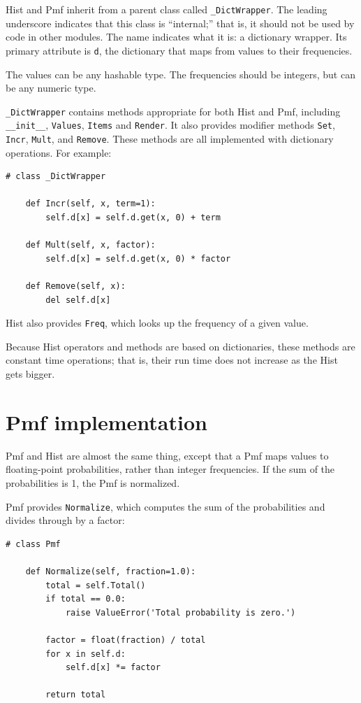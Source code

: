 \documentclass[12pt]{book}
\theoremstyle{exercise}
\begin{document}
Hist and Pmf inherit from a parent class called \verb"_DictWrapper".
The leading underscore indicates that this class is ``internal;'' that
is, it should not be used by code in other modules.  The name
indicates what it is: a dictionary wrapper.  Its primary attribute is
{\tt d}, the dictionary that maps from values to their frequencies.%
%
%

The values can be any hashable type.  The frequencies should be integers,
but can be any numeric type.%

\verb"_DictWrapper" contains methods appropriate for both
Hist and Pmf, including \verb"__init__", {\tt Values},
{\tt Items} and {\tt Render}.  It also provides modifier
methods {\tt Set}, {\tt Incr}, {\tt Mult}, and {\tt Remove}.  These
methods are all implemented with dictionary operations.  For example:%

\begin{verbatim}
# class _DictWrapper

    def Incr(self, x, term=1):
        self.d[x] = self.d.get(x, 0) + term

    def Mult(self, x, factor):
        self.d[x] = self.d.get(x, 0) * factor

    def Remove(self, x):
        del self.d[x]
\end{verbatim}

Hist also provides {\tt Freq}, which looks up the frequency
of a given value.%

Because Hist operators and methods are based on dictionaries,
these methods are constant time operations;
that is, their run time does not increase as the Hist gets bigger.%


\section{Pmf implementation}

Pmf and Hist are almost the same thing, except that a Pmf
maps values to floating-point probabilities, rather than integer
frequencies.  If the sum of the probabilities is 1, the Pmf is normalized.%

Pmf provides {\tt Normalize}, which computes the sum of the
probabilities and divides through by a factor:

\begin{verbatim}
# class Pmf

    def Normalize(self, fraction=1.0):
        total = self.Total()
        if total == 0.0:
            raise ValueError('Total probability is zero.')

        factor = float(fraction) / total
        for x in self.d:
            self.d[x] *= factor

        return total
\end{verbatim}
\end{document}
